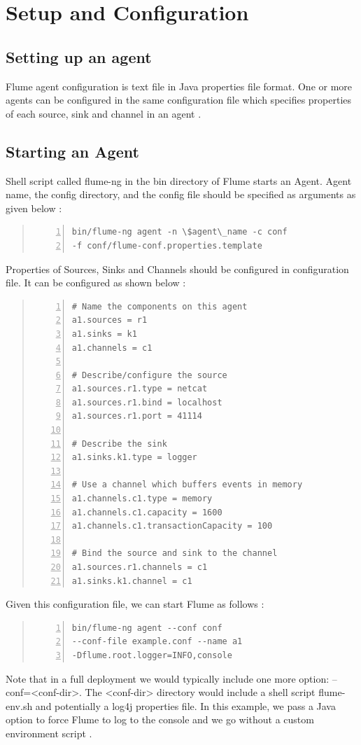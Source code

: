 \documentclass[9pt,twocolumn,twoside]{../../styles/osajnl}
\begin{document}
\section{Setup and Configuration}
\subsection{Setting up an agent}
Flume agent configuration is text file in Java properties file format. One or more agents can be configured in the same configuration file which specifies properties of each source, sink and channel in an agent \cite{user-manual}.

\subsection{Starting an Agent}
Shell script called flume-ng in the bin directory of Flume starts an Agent. Agent name, the config directory, and the config file should be specified as arguments as given below \cite{user-manual}:

\begin{quote}
\begin{Verbatim}[numbers=left]
bin/flume-ng agent -n \$agent\_name -c conf 
-f conf/flume-conf.properties.template
\end{Verbatim}
\end{quote}

Properties of Sources, Sinks and Channels should be configured in configuration file. It can be configured as shown below \cite{user-manual}:
\begin{quote}
\begin{Verbatim}[numbers=left]
# Name the components on this agent
a1.sources = r1
a1.sinks = k1
a1.channels = c1

# Describe/configure the source
a1.sources.r1.type = netcat
a1.sources.r1.bind = localhost
a1.sources.r1.port = 41114

# Describe the sink
a1.sinks.k1.type = logger

# Use a channel which buffers events in memory
a1.channels.c1.type = memory
a1.channels.c1.capacity = 1600
a1.channels.c1.transactionCapacity = 100

# Bind the source and sink to the channel
a1.sources.r1.channels = c1
a1.sinks.k1.channel = c1\end{Verbatim}
\end{quote}

Given this configuration file, we can start Flume as follows \cite{user-manual}:
\begin{quote}
\begin{Verbatim}[numbers=left]
bin/flume-ng agent --conf conf 
--conf-file example.conf --name a1 
-Dflume.root.logger=INFO,console
\end{Verbatim}
\end{quote}
Note that in a full deployment we would typically include one more option: --conf=<conf-dir>. The <conf-dir> directory would include a shell script flume-env.sh and potentially a log4j properties file. In this example, we pass a Java option to force Flume to log to the console and we go without a custom environment script \cite{user-manual}.
\end{document}
